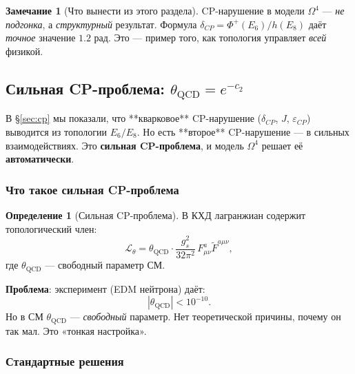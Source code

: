 \documentclass[11pt,a4paper]{article}
\newcommand{\Om}{\Omega^4}
\theoremstyle{definition}
\newtheorem{definition}[theorem]{Определение}
\newtheorem{remark}[theorem]{Замечание}
\begin{document}
\begin{remark}[Что вынести из этого раздела]
\label{rem:cp-takeaway}
CP-нарушение в модели $\Om$ — \emph{не подгонка}, а 
\emph{структурный} результат. Формула 
$\delta_{CP} = \Phi^+(E_6)/h(E_8)$ даёт \emph{точное} 
значение $1.2$ рад. Это — пример того, как топология 
управляет \emph{всей} физикой.
\end{remark}
\subsection{Сильная CP-проблема: $\theta_{\text{QCD}} = e^{-c_2}$}
\label{subsec:strong-cp-review}

В §\ref{sec:cp} мы показали, что **кварковое** CP-нарушение ($\delta_{CP}$,
$J$, $\varepsilon_{CP}$) выводится из топологии $E_6/E_8$. Но есть
**второе** CP-нарушение — в сильных взаимодействиях. Это
\textbf{сильная CP-проблема}, и модель $\Om$ решает её
\textbf{автоматически}.

\subsubsection{Что такое сильная CP-проблема}

\begin{definition}[Сильная CP-проблема]
\label{def:strong-cp-review}
В КХД лагранжиан содержит топологический член:
\begin{equation}
    \mathcal{L}_{\theta} = \theta_{\text{QCD}} \cdot
    \frac{g_s^2}{32\pi^2} \, F_{\mu\nu}^a \tilde{F}^{a\mu\nu},
    \label{eq:theta-term-review}
\end{equation}
где $\theta_{\text{QCD}}$ — свободный параметр СМ.

\medskip\noindent
\textbf{Проблема}: эксперимент (EDM нейтрона) даёт:
\begin{equation}
    |\theta_{\text{QCD}}| < 10^{-10}.
\end{equation}
Но в СМ $\theta_{\text{QCD}}$ — \emph{свободный} параметр. Нет
теоретической причины, почему он так мал. Это «тонкая настройка».
\end{definition}

\subsubsection{Стандартные решения}
\end{document}
